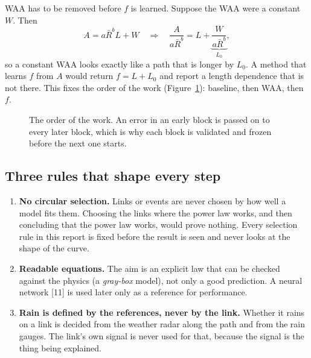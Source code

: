 \documentclass[11pt,a4paper]{article}
\newcommand{\Arain}{A_{\mathrm{rain}}}
\newcommand{\Rbar}{\bar{R}}
\begin{document}
WAA has to be removed before $f$ is learned. Suppose the WAA were a constant $W$. Then
\begin{equation}
A = a\Rbar^{b}L + W
\quad\Longrightarrow\quad
\frac{A}{a\Rbar^{b}} = L + \underbrace{\frac{W}{a\Rbar^{b}}}_{L_{0}} ,
\label{eq:L0}
\end{equation}
so a constant WAA looks exactly like a path that is longer by $L_{0}$. A method that learns $f$ from $A$ would
return $f = L + L_{0}$ and report a length dependence that is not there. This fixes the order of the work
(Figure~\ref{fig:chain}): baseline, then WAA, then $f$.

\begin{figure}[H]
\centering
{}
\caption{The order of the work. An error in an early block is passed on to every later block, which is why each block
is validated and frozen before the next one starts.}
\label{fig:chain}
\end{figure}

\subsection{Three rules that shape every step}

\begin{enumerate}
\item \textbf{No circular selection.} Links or events are never chosen by how well a model fits them. Choosing the
links where the power law works, and then concluding that the power law works, would prove nothing. Every selection
rule in this report is fixed before the result is seen and never looks at the shape of the curve.
\item \textbf{Readable equations.} The aim is an explicit law that can be checked against the physics (a
\emph{gray-box} model), not only a good prediction. A neural network [11] is used later only as a reference for
performance.
\item \textbf{Rain is defined by the references, never by the link.} Whether it rains on a link is decided from the
weather radar along the path and from the rain gauges. The link's own signal is never used for that, because the
signal is the thing being explained.
\end{enumerate}
\end{document}
